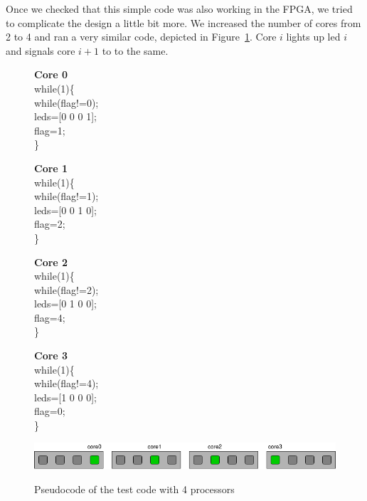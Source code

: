 Once we checked that this simple code was also working in the FPGA, we tried to complicate the design a little bit more.
We increased the number of cores from 2 to 4 and ran a very similar code, depicted in Figure~\ref{4led-code}. Core $i$ lights up led $i$ and signals core $i+1$ to to the same.

\begin{figure}[htbp]
\centering
\begin{minipage}[t][3cm][t]{3cm}
\textbf{Core 0}\\
while(1)\{\\
\hspace*{.4cm}while(flag!=0);\\
\hspace*{.4cm}leds=[0 0 0 1];\\
\hspace*{.4cm}flag=1;\\
\}
\end{minipage}\hspace{.5cm}
\begin{minipage}[t][3cm][t]{3cm}
\textbf{Core 1}\\
while(1)\{\\
\hspace*{.4cm}while(flag!=1);\\
\hspace*{.4cm}leds=[0 0 1 0];\\
\hspace*{.4cm}flag=2;\\
\}
\end{minipage}\hspace{.5cm}
\begin{minipage}[t][3cm][t]{3cm}
\textbf{Core 2}\\
while(1)\{\\
\hspace*{.4cm}while(flag!=2);\\
\hspace*{.4cm}leds=[0 1 0 0];\\
\hspace*{.4cm}flag=4;\\
\}
\end{minipage}\hspace{.5cm}
\begin{minipage}[t][3cm][t]{3cm}
\textbf{Core 3}\\
while(1)\{\\
\hspace*{.4cm}while(flag!=4);\\
\hspace*{.4cm}leds=[1 0 0 0];\\
\hspace*{.4cm}flag=0;\\
\}
\end{minipage}
\includegraphics[width=.72\textwidth]{images/leds4_fig.png}
\label{4led-code}
\caption{Pseudocode of the test code with 4 processors}
\end{figure}

